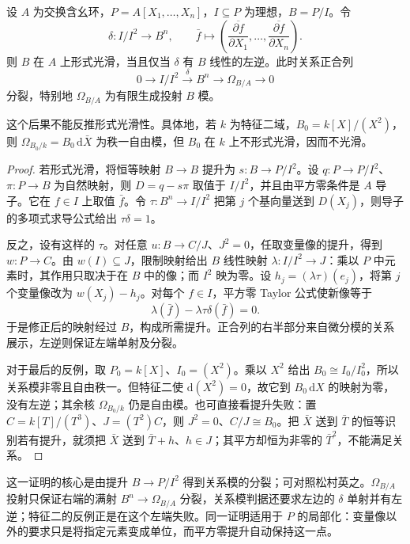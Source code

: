 \begin{theorem}[形式光滑的关系模判据]\label{b3:thm:formal-smooth-conormal-splitting}\label{b3:thm:free-differentials-not-smooth}
	设 \(A\) 为交换含幺环，\(P=A[X_1,\ldots,X_n]\)，\(I\subseteq P\) 为理想，\(B=P/I\)。令
	\[
		\delta:I/I^2\longrightarrow B^n, \qquad \bar f\longmapsto \left(\overline{\frac{\partial f}{\partial X_1}},\ldots, \overline{\frac{\partial f}{\partial X_n}}\right).
	\]
	则 \(B\) 在 \(A\) 上形式光滑，当且仅当 \(\delta\) 有 \(B\) 线性的左逆。此时关系正合列
	\[
		0\longrightarrow I/I^2\xrightarrow{\delta}B^n \longrightarrow\Omega_{B/A}\longrightarrow0
	\]
	分裂，特别地 \(\Omega_{B/A}\) 为有限生成投射 \(B\) 模。

	这个后果不能反推形式光滑性。具体地，若 \(k\) 为特征二域，\(B_0=k[X]/(X^2)\)，则 \(\Omega_{B_0/k}=B_0\,\mathrm{d}\bar X\) 为秩一自由模，但 \(B_0\) 在 \(k\) 上不形式光滑，因而不光滑。
\end{theorem}
\begin{proof}
	若形式光滑，将恒等映射 \(B\to B\) 提升为 \(s:B\to P/I^2\)。设 \(q:P\to P/I^2\)、\(\pi:P\to B\) 为自然映射，则 \(D=q-s\pi\) 取值于 \(I/I^2\)，并且由平方零条件是 \(A\) 导子。它在 \(f\in I\) 上取值 \(\bar f\)。令 \(\tau:B^n\to I/I^2\) 把第 \(j\) 个基向量送到 \(D(X_j)\)，则导子的多项式求导公式给出 \(\tau\delta=1\)。

	反之，设有这样的 \(\tau\)。对任意 \(u:B\to C/J\)、\(J^2=0\)，任取变量像的提升，得到 \(w:P\to C\)。由 \(w(I)\subseteq J\)，限制映射给出 \(B\) 线性映射 \(\lambda:I/I^2\to J\)：乘以 \(P\) 中元素时，其作用只取决于在 \(B\) 中的像；而 \(I^2\) 映为零。设 \(h_j=(\lambda\tau)(e_j)\)，将第 \(j\) 个变量像改为 \(w(X_j)-h_j\)。对每个 \(f\in I\)，平方零 Taylor 公式使新像等于
	\[
		\lambda(\bar f)-\lambda\tau\delta(\bar f)=0.
	\]
	于是修正后的映射经过 \(B\)，构成所需提升。正合列的右半部分来自微分模的关系展示，左逆则保证左端单射及分裂。

	对于最后的反例，取 \(P_0=k[X]\)、\(I_0=(X^2)\)。乘以 \(X^2\) 给出 \(B_0\cong I_0/I_0^2\)，所以关系模非零且自由秩一。但特征二使 \(\mathrm{d}(X^2)=0\)，故它到 \(B_0\,\mathrm{d}X\) 的映射为零，没有左逆；其余核 \(\Omega_{B_0/k}\) 仍是自由模。也可直接看提升失败：置 \(C=k[T]/(T^3)\)、\(J=(T^2)C\)，则 \(J^2=0\)、\(C/J\cong B_0\)。把 \(\bar X\) 送到 \(\bar T\) 的恒等识别若有提升，就须把 \(\bar X\) 送到 \(\bar T+h\)、\(h\in J\)；其平方却恒为非零的 \(\bar T^2\)，不能满足关系。
\end{proof}

这一证明的核心是由提升 \(B\to P/I^2\) 得到关系模的分裂；可对照松村英之\cite[Theorem 25.2, pp. 194--195]{Matsumura1989CommutativeRingTheory}。\(\Omega_{B/A}\) 投射只保证右端的满射 \(B^n\to\Omega_{B/A}\) 分裂，关系模判据还要求左边的 \(\delta\) 单射并有左逆；特征二的反例正是在这个左端失败。同一证明适用于 \(P\) 的局部化：变量像以外的要求只是将指定元素变成单位，而平方零提升自动保持这一点。

